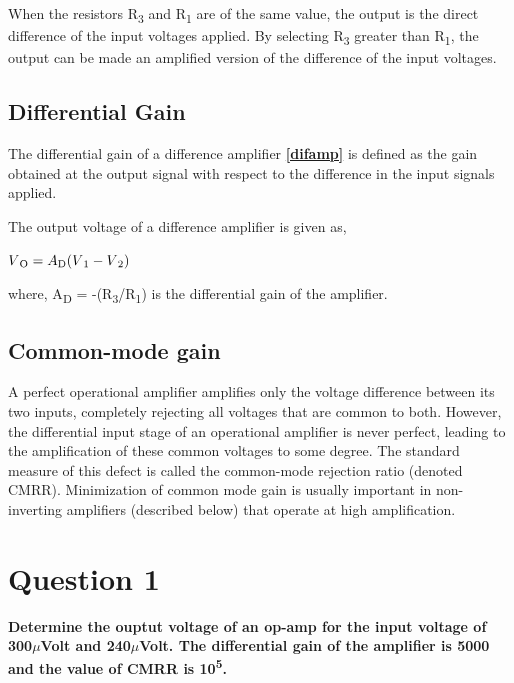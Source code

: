 \documentclass[11pt,a4paper,oneside]{article}
\begin{document}
When the resistors R\textsubscript{3} and R\textsubscript{1} are of the same value, the output is the direct difference of the input voltages applied. By selecting R\textsubscript{3} greater than R\textsubscript{1}, the output can be made an amplified version of the difference of the input voltages.

\subsection{Differential Gain}

The differential gain of a difference amplifier \textbf{\ref{difamp}} is defined as the gain obtained at the output signal with respect to the difference in the input signals applied.

The output voltage of a difference amplifier is given as,

\begin{center}
	$V\textsubscript{O} = A\textsubscript{D}(V\textsubscript{1} - V\textsubscript{2})$
\end{center}

where, A\textsubscript{D} = -(R\textsubscript{3}/R\textsubscript{1}) is the differential gain of the amplifier.

\subsection{Common-mode gain}

A perfect operational amplifier amplifies only the voltage difference between its two inputs, completely rejecting all voltages that are common to both. However, the differential input stage of an operational amplifier is never perfect, leading to the amplification of these common voltages to some degree. The standard measure of this defect is called the common-mode rejection ratio (denoted CMRR). Minimization of common mode gain is usually important in non-inverting amplifiers (described below) that operate at high amplification.

\clearpage

\section{Question 1}
\noindent \large \textbf{Determine the ouptut voltage of an op-amp for the input voltage of 300$\mu$Volt and 240$\mu$Volt. The differential gain of the amplifier is 5000 and the value of CMRR is 10\textsuperscript{5}.}

\vskip 1cm
\end{document}
